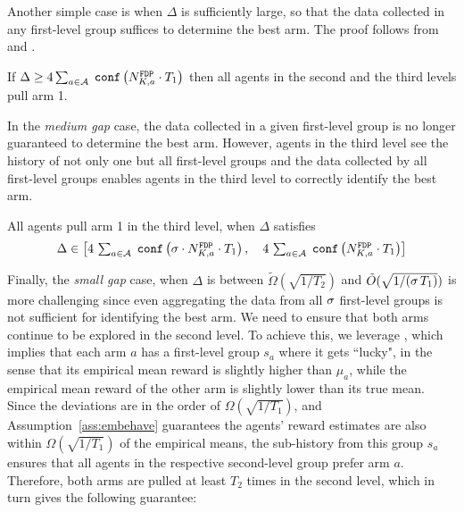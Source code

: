 Another simple case is when $\Delta$ is sufficiently large, so that
the data collected in any first-level group suffices to determine the best arm. The proof follows from  and .

\begin{lemma}\label{3levelbigcase}
If
  $ \Delta \geq 4 \sum_{a\in\A}\; \conf{\fdpN[a]\cdot T_1}$
then all agents in the second and the third levels pull arm 1.
\end{lemma}

In the \emph{medium gap} case, the data collected in a given first-level group is no longer guaranteed to determine the best arm. However, agents in the third level see the history of not only one but all first-level groups and the data collected by all first-level groups enables agents in the third level to correctly identify the best arm.


\begin{lemma}\label{3levelmedium}
  All agents pull arm 1 in the third level, when $\Delta$ satisfies
\[ \textstyle \Delta\in \left[
    4\,\sum_{a\in\A}\; \conf{\NG\cdot \fdpN[a]\cdot T_1},\quad
    4\,\sum_{a\in\A}\; \conf{\fdpN[a]\cdot T_1}
 \right] \]
\end{lemma}


Finally, the \emph{small gap} case, when  $\Delta$ is between
$\tilde\Omega(\sqrt{1/T_2})$ and $\tilde O(\sqrt{1/(\NG\, T_1)})$
is more challenging since even aggregating the data from all $\NG$
first-level groups is not sufficient for identifying the best arm.
We need to ensure that both arms continue to be explored in the second level.
To achieve this, we leverage , which implies
that each arm $a$ has a first-level group $s_a$ where it gets ``lucky", in the sense that its empirical mean reward is slightly higher than $\mu_a$, while the empirical mean reward of the other arm is slightly lower than its true mean. Since the
deviations are in the order of $\Omega(\sqrt{1/T_1})$, and Assumption~\ref{ass:embehave} guarantees the agents' reward estimates are also within $\Omega(\sqrt{1/T_1})$ of the empirical means, the sub-history
from this group $s_a$ ensures that all agents in the respective second-level group prefer arm $a$. Therefore, both arms are pulled at least $T_2$ times in the second level, which in turn gives the following guarantee:


